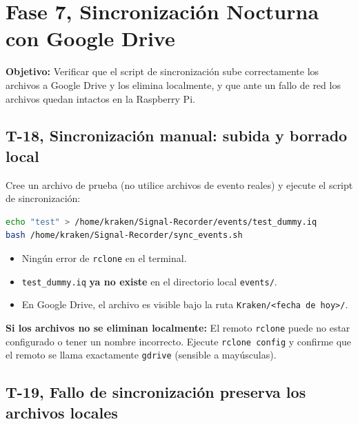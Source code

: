 \section{Fase 7, Sincronización Nocturna con Google Drive}

\textbf{Objetivo:} Verificar que el script de sincronización sube correctamente los archivos a Google Drive y los elimina localmente, y que ante un fallo de red los archivos quedan intactos en la Raspberry Pi.

\subsection{T-18, Sincronización manual: subida y borrado local}

Cree un archivo de prueba (no utilice archivos de evento reales) y ejecute el script de sincronización:

\begin{lstlisting}[language=bash]
echo "test" > /home/kraken/Signal-Recorder/events/test_dummy.iq
bash /home/kraken/Signal-Recorder/sync_events.sh
\end{lstlisting}

\begin{tcolorbox}[colback=gray!5, colframe=deyposcolor, title=Resultado esperado (T-18)]
\begin{itemize}
    \item Ningún error de \texttt{rclone} en el terminal.
    \item \texttt{test\_dummy.iq} \textbf{ya no existe} en el directorio local \texttt{events/}.
    \item En Google Drive, el archivo es visible bajo la ruta \texttt{Kraken/<fecha de hoy>/}.
\end{itemize}
\end{tcolorbox}

\begin{important}
    \textbf{Si los archivos no se eliminan localmente:} El remoto \texttt{rclone} puede no estar configurado o tener un nombre incorrecto. Ejecute \texttt{rclone config} y confirme que el remoto se llama exactamente \texttt{gdrive} (sensible a mayúsculas).
\end{important}

\subsection{T-19, Fallo de sincronización preserva los archivos locales}

